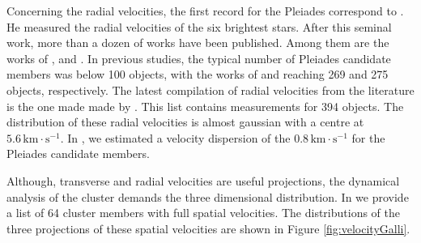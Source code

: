 Concerning the radial velocities, the first record for the Pleiades correspond to \citet{1904ApJ....19..338A}. He measured the radial velocities of the six brightest stars. After this seminal work, more than a dozen of works have been published. Among them are the works of \citet{1924PhDT.........1W,1944ApJ...100..360S,1979BICDS..16....2M,1991ApJ...377..141L,1992A&A...255..130R,1994AJ....108..160S,1997A&A...320...74M,1996ApJ...469..706M,2000AJ....119.1303T,2006ARep...50..714L,2009AAS...21340702W,2009A&A...498..949M}, and \citet{2013AJ....146..134K}. In previous studies, the typical number of Pleiades candidate members was below 100 objects, with the works of \citet{2009AAS...21340702W} and \citet{2009A&A...498..949M} reaching 269 and 275 objects, respectively. The latest compilation of radial velocities from the literature is the one made made by \citet{Galli2017}. This list contains measurements for 394 objects. The distribution of these radial velocities is almost gaussian with a centre at $5.6\,\mathrm{km \cdot s^{-1}}$. In \citet{Galli2017}, we estimated a velocity dispersion of the $0.8\,\mathrm{ km\cdot s^{-1}}$ for the Pleiades candidate members.

Although, transverse and radial velocities are useful projections, the dynamical analysis of the cluster demands the three dimensional distribution. In \citet{Galli2017} we provide a list of 64 cluster members with full spatial velocities. The distributions of the three projections of these spatial velocities are shown in Figure \ref{fig:velocityGalli}.

